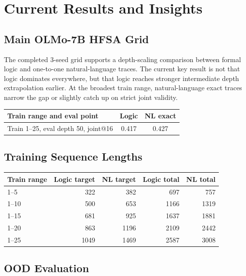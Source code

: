 \section{Current Results and Insights}

\subsection{Main OLMo-7B HFSA Grid}

The completed 3-seed grid supports a depth-scaling comparison between formal
logic and one-to-one natural-language traces. The current key result is not
that logic dominates everywhere, but that logic reaches stronger intermediate
depth extrapolation earlier. At the broadest train range, natural-language
exact traces narrow the gap or slightly catch up on strict joint validity.

\begin{center}
\begin{tabular}{lcc}
\toprule
Train range and eval point & Logic & NL exact \\
\midrule
Train 1--25, eval depth 50, joint@16 & 0.417 & 0.427 \\
\bottomrule
\end{tabular}
\end{center}

\subsection{Training Sequence Lengths}

\begin{center}
\begin{tabular}{lrrrr}
\toprule
Train range & Logic target & NL target & Logic total & NL total \\
\midrule
1--5 & 322 & 382 & 697 & 757 \\
1--10 & 500 & 653 & 1166 & 1319 \\
1--15 & 681 & 925 & 1637 & 1881 \\
1--20 & 863 & 1196 & 2109 & 2442 \\
1--25 & 1049 & 1469 & 2587 & 3008 \\
\bottomrule
\end{tabular}
\end{center}

\subsection{OOD Evaluation}

